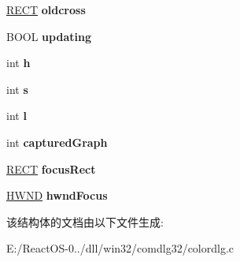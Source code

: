 \begin{DoxyCompactItemize}
\hyperlink{structtag_r_e_c_t}{R\+E\+CT} {\bfseries oldcross}
\item 
\mbox{\label{struct_c_c_p_r_i_v_a_t_e_a96c2faced551ea99f5ffd237818dae4c}} 
B\+O\+OL {\bfseries updating}
\item 
\mbox{\label{struct_c_c_p_r_i_v_a_t_e_aa46dcea7a016b65cf69a185abcd6bc3a}} 
int {\bfseries h}
\item 
\mbox{\label{struct_c_c_p_r_i_v_a_t_e_a7ce1572edfecd2e89f881ec4470267fe}} 
int {\bfseries s}
\item 
\mbox{\label{struct_c_c_p_r_i_v_a_t_e_a82ead8e6859e205b12e36e3cc09a7423}} 
int {\bfseries l}
\item 
\mbox{\label{struct_c_c_p_r_i_v_a_t_e_a7efd429d20dc789e534b0bc1168795ce}} 
int {\bfseries captured\+Graph}
\item 
\mbox{\label{struct_c_c_p_r_i_v_a_t_e_acae329720e12a446737674bc951d6977}} 
\hyperlink{structtag_r_e_c_t}{R\+E\+CT} {\bfseries focus\+Rect}
\item 
\mbox{\label{struct_c_c_p_r_i_v_a_t_e_ad3c877d0b71d6c1b172a7ace23e38b42}} 
\hyperlink{interfacevoid}{H\+W\+ND} {\bfseries hwnd\+Focus}
\end{DoxyCompactItemize}


该结构体的文档由以下文件生成\+:\begin{DoxyCompactItemize}
\item 
E\+:/\+React\+O\+S-\/0../dll/win32/comdlg32/colordlg.\+c\end{DoxyCompactItemize}
